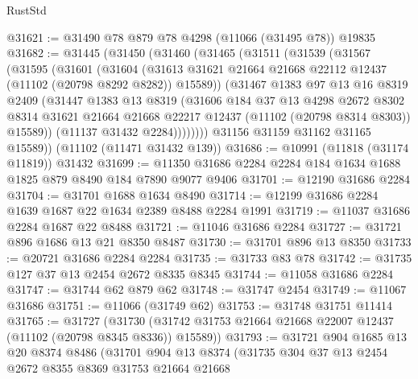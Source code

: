 \begin{lexlean}{RustStd}
\begin{coremodule}
@31621 := @31490 @78 @879 @78 @4298 (@11066 (@31495 @78)) @19835
@31682 := @31445
    (@31450
      (@31460
        (@31465
          (@31511
            (@31539
              (@31567
                (@31595
                  (@31601
                    (@31604
                      (@31613
                        @31621
                        @21664
                        @21668
                        @22112
                        @12437
                        (@11102 (@20798 @8292 @8282))
                        @15589))
                    (@31467
                      @1383
                      @97
                      @13
                      @16
                      @8319
                      @2409
                      (@31447
                        @1383
                        @13
                        @8319
                        (@31606
                          @184
                          @37
                          @13
                          @4298
                          @2672
                          @8302
                          @8314
                          @31621
                          @21664
                          @21668
                          @22217
                          @12437
                          (@11102 (@20798 @8314 @8303))
                          @15589))
                      (@11137 @31432 @2284))))))))
        @31156
        @31159
        @31162
        @31165
        @15589))
    (@11102 (@11471 @31432 @139))
@31686 := @10991 (@11818 (@31174 @11819)) @31432
@31699 := @11350 @31686 @2284 @2284 @184 @1634 @1688 @1825 @879 @8490 @184 @7890 @9077 @9406
@31701 := @12190 @31686 @2284
@31704 := @31701 @1688 @1634 @8490
@31714 := @12199 @31686 @2284 @1639 @1687 @22 @1634 @2389 @8488 @2284 @1991
@31719 := @11037 @31686 @2284 @1687 @22 @8488
@31721 := @11046 @31686 @2284
@31727 := @31721 @896 @1686 @13 @21 @8350 @8487
@31730 := @31701 @896 @13 @8350
@31733 := @20721 @31686 @2284 @2284
@31735 := @31733 @83 @78
@31742 := @31735 @127 @37 @13 @2454 @2672 @8335 @8345
@31744 := @11058 @31686 @2284
@31747 := @31744 @62 @879 @62
@31748 := @31747 @2454
@31749 := @11067 @31686
@31751 := @11066 (@31749 @62)
@31753 := @31748 @31751 @11414
@31765 := @31727
    (@31730 (@31742 @31753 @21664 @21668 @22007 @12437 (@11102 (@20798 @8345 @8336)) @15589))
@31793 := @31721
    @904
    @1685
    @13
    @20
    @8374
    @8486
    (@31701
      @904
      @13
      @8374
      (@31735
        @304
        @37
        @13
        @2454
        @2672
        @8355
        @8369
        @31753
        @21664
        @21668

\end{coremodule}
\end{lexlean}
